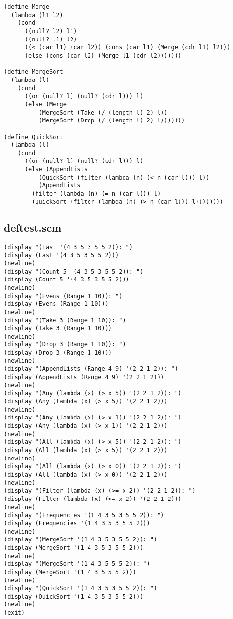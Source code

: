 \begin{verbatim}
(define Merge
  (lambda (l1 l2)
    (cond
      ((null? l2) l1)
      ((null? l1) l2)
      ((< (car l1) (car l2)) (cons (car l1) (Merge (cdr l1) l2)))
      (else (cons (car l2) (Merge l1 (cdr l2)))))))

(define MergeSort
  (lambda (l)
    (cond
      ((or (null? l) (null? (cdr l))) l)
      (else (Merge
	      (MergeSort (Take (/ (length l) 2) l))
	      (MergeSort (Drop (/ (length l) 2) l)))))))

(define QuickSort
  (lambda (l)
    (cond
      ((or (null? l) (null? (cdr l))) l)
      (else (AppendLists
	      (QuickSort (filter (lambda (n) (< n (car l))) l))
	      (AppendLists
		(filter (lambda (n) (= n (car l))) l)
		(QuickSort (filter (lambda (n) (> n (car l))) l))))))))
\end{verbatim}
\normalsize

\subsection{deftest.scm}
\scriptsize
\begin{verbatim}
(display "(Last '(4 3 5 3 5 5 2)): ")
(display (Last '(4 3 5 3 5 5 2)))
(newline)
(display "(Count 5 '(4 3 5 3 5 5 2)): ")
(display (Count 5 '(4 3 5 3 5 5 2)))
(newline)
(display "(Evens (Range 1 10)): ")
(display (Evens (Range 1 10)))
(newline)
(display "(Take 3 (Range 1 10)): ")
(display (Take 3 (Range 1 10)))
(newline)
(display "(Drop 3 (Range 1 10)): ")
(display (Drop 3 (Range 1 10)))
(newline)
(display "(AppendLists (Range 4 9) '(2 2 1 2)): ")
(display (AppendLists (Range 4 9) '(2 2 1 2)))
(newline)
(display "(Any (lambda (x) (> x 5)) '(2 2 1 2)): ")
(display (Any (lambda (x) (> x 5)) '(2 2 1 2)))
(newline)
(display "(Any (lambda (x) (> x 1)) '(2 2 1 2)): ")
(display (Any (lambda (x) (> x 1)) '(2 2 1 2)))
(newline)
(display "(All (lambda (x) (> x 5)) '(2 2 1 2)): ")
(display (All (lambda (x) (> x 5)) '(2 2 1 2)))
(newline)
(display "(All (lambda (x) (> x 0)) '(2 2 1 2)): ")
(display (All (lambda (x) (> x 0)) '(2 2 1 2)))
(newline)
(display "(Filter (lambda (x) (>= x 2)) '(2 2 1 2)): ")
(display (Filter (lambda (x) (>= x 2)) '(2 2 1 2)))
(newline)
(display "(Frequencies '(1 4 3 5 3 5 5 2)): ")
(display (Frequencies '(1 4 3 5 3 5 5 2)))
(newline)
(display "(MergeSort '(1 4 3 5 3 5 5 2)): ")
(display (MergeSort '(1 4 3 5 3 5 5 2)))
(newline)
(display "(MergeSort '(1 4 3 5 5 5 2)): ")
(display (MergeSort '(1 4 3 5 5 5 2)))
(newline)
(display "(QuickSort '(1 4 3 5 3 5 5 2)): ")
(display (QuickSort '(1 4 3 5 3 5 5 2)))
(newline)
(exit)
\end{verbatim}
\normalsize

